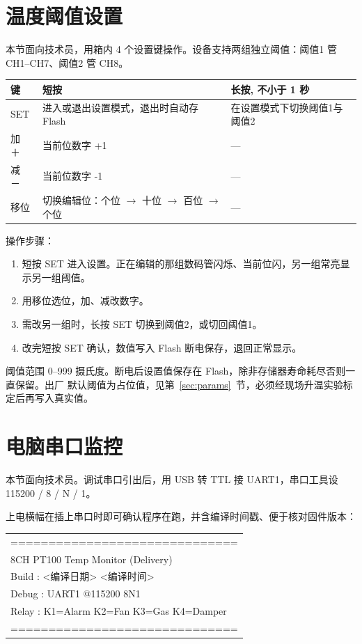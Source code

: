 \documentclass[a4paper,11pt]{ctexart}
\newenvironment{notebox}[1][red!7]{%
  \def\noteboxcolor{#1}%
  \par\smallskip\noindent
  \begin{lrbox}{\noteboxsave}%
  \begin{minipage}{\dimexpr\linewidth-2\fboxsep-2\fboxrule\relax}\small\setlength{\parskip}{2pt}}%
  {\end{minipage}\end{lrbox}%
  \fcolorbox{black!35}{\noteboxcolor}{\usebox{\noteboxsave}}\par\smallskip}
\begin{document}
\section{温度阈值设置}
本节面向技术员，用箱内 4 个设置键操作。设备支持两组独立阈值：阈值1 管 CH1--CH7、阈值2
管 CH8。
\renewcommand{\arraystretch}{1.3}
\begin{center}
\begin{tabular}{|l|L{5.6cm}|L{5.0cm}|}
\hline
键 & 短按 & 长按, 不小于 1 秒\\
\hline
SET & 进入或退出设置模式，退出时自动存 Flash & 在设置模式下切换阈值1与阈值2\\
\hline
加 ＋ & 当前位数字 +1 & ---\\
\hline
减 － & 当前位数字 -1 & ---\\
\hline
移位 & 切换编辑位：个位 $\to$ 十位 $\to$ 百位 $\to$ 个位 & ---\\
\hline
\end{tabular}
\end{center}
\renewcommand{\arraystretch}{1.0}
操作步骤：
\begin{enumerate}[leftmargin=1.6em,itemsep=2pt]
  \item 短按 SET 进入设置。正在编辑的那组数码管闪烁、当前位闪，另一组常亮显示另一组阈值。
  \item 用移位选位，加、减改数字。
  \item 需改另一组时，长按 SET 切换到阈值2，或切回阈值1。
  \item 改完短按 SET 确认，数值写入 Flash 断电保存，退回正常显示。
\end{enumerate}
\begin{notebox}
阈值范围 0--999 摄氏度。断电后设置值保存在 Flash，除非存储器寿命耗尽否则一直保留。出厂
默认阈值为占位值，见第~\ref{sec:params}~节，必须经现场升温实验标定后再写入真实值。
\end{notebox}

\section{电脑串口监控}
本节面向技术员。调试串口引出后，用 USB 转 TTL 接 UART1，串口工具设 115200 / 8 / N / 1。

上电横幅在插上串口时即可确认程序在跑，并含编译时间戳、便于核对固件版本：
\begin{center}\small\ttfamily
\begin{tabular}{@{}l@{}}
==============================\\
 8CH PT100 Temp Monitor (Delivery)\\
 Build : <编译日期> <编译时间>\\
 Debug : UART1 @115200 8N1\\
 Relay : K1=Alarm K2=Fan K3=Gas K4=Damper\\
==============================\\
\end{tabular}
\end{center}
\end{document}
